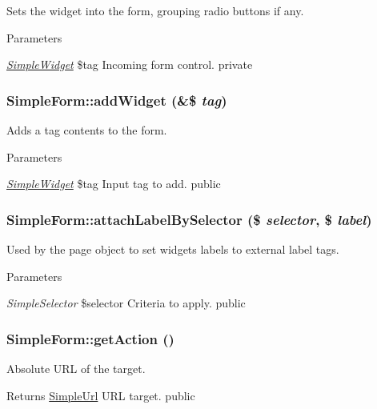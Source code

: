 \label{class_simple_form_a2e83f01911ebc78292113a0176171793}
Sets the widget into the form, grouping radio buttons if any. 
\begin{DoxyParams}{Parameters}
\item[{\em \hyperlink{class_simple_widget}{SimpleWidget}}]\$tag Incoming form control.  private \end{DoxyParams}
\hypertarget{class_simple_form_add369cd204b2f32106bcaec5023125af}{
\subsubsection[{addWidget}]{\setlength{\rightskip}{0pt plus 5cm}SimpleForm::addWidget (\&\$ {\em tag})}}
\label{class_simple_form_add369cd204b2f32106bcaec5023125af}
Adds a tag contents to the form. 
\begin{DoxyParams}{Parameters}
\item[{\em \hyperlink{class_simple_widget}{SimpleWidget}}]\$tag Input tag to add.  public \end{DoxyParams}
\hypertarget{class_simple_form_a4e98a18c52653464f565a4f699ecdeaa}{
\subsubsection[{attachLabelBySelector}]{\setlength{\rightskip}{0pt plus 5cm}SimpleForm::attachLabelBySelector (\$ {\em selector}, \/  \$ {\em label})}}
\label{class_simple_form_a4e98a18c52653464f565a4f699ecdeaa}
Used by the page object to set widgets labels to external label tags. 
\begin{DoxyParams}{Parameters}
\item[{\em SimpleSelector}]\$selector Criteria to apply.  public \end{DoxyParams}
\hypertarget{class_simple_form_a3a0e6d31118a476bc91c0de7c041a79c}{
\subsubsection[{getAction}]{\setlength{\rightskip}{0pt plus 5cm}SimpleForm::getAction ()}}
\label{class_simple_form_a3a0e6d31118a476bc91c0de7c041a79c}
Absolute URL of the target. \begin{DoxyReturn}{Returns}
\hyperlink{class_simple_url}{SimpleUrl} URL target.  public 
\end{DoxyReturn}
